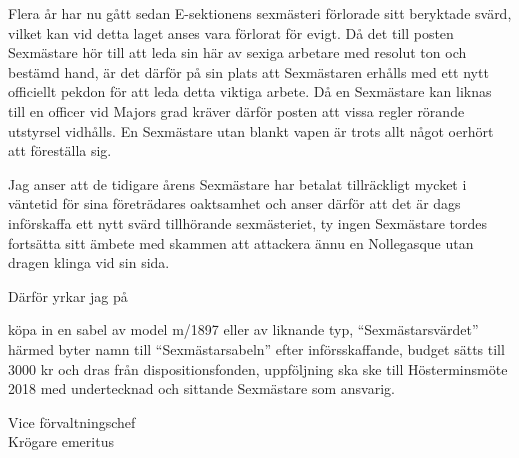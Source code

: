 \documentclass[../_main/handlingar.tex]{subfiles}
\begin{document}

Flera år har nu gått sedan E-sektionens sexmästeri förlorade sitt beryktade svärd, vilket kan vid detta laget anses vara förlorat för evigt. Då det till posten Sexmästare hör till att leda sin här av sexiga arbetare med resolut ton och bestämd hand, är det därför på sin plats att Sexmästaren erhålls med ett nytt officiellt pekdon för att leda detta viktiga arbete. Då en Sexmästare kan liknas till en officer vid Majors grad kräver därför posten att vissa regler rörande utstyrsel vidhålls. En Sexmästare utan blankt vapen är trots allt något oerhört att föreställa sig.

Jag anser att de tidigare årens Sexmästare har betalat tillräckligt mycket i väntetid för sina företrädares oaktsamhet och anser därför att det är dags införskaffa ett nytt svärd tillhörande sexmästeriet, ty ingen Sexmästare tordes fortsätta sitt ämbete med skammen att attackera ännu en Nollegasque utan dragen klinga vid sin sida.

Därför yrkar jag på
\begin{attsatser}
    \att köpa in en sabel av model m/1897 eller av liknande typ,
    \att ``Sexmästarsvärdet'' härmed byter namn till ``Sexmästarsabeln'' efter införsskaffande,
    \att budget sätts till 3000 kr och dras från dispositionsfonden,
    \att uppföljning ska ske till Hösterminsmöte 2018 med undertecknad och sittande Sexmästare som ansvarig.
\end{attsatser}

\begin{signatures}{1}
    \mvh
    \signature{Markus Rahne}{Vice förvaltningschef \\ Krögare emeritus}
\end{signatures}
\end{document}
